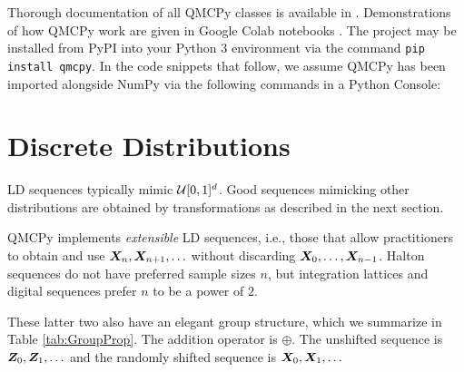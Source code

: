 \documentclass[graybox,footinfo]{svmult}
\begin{document}
Thorough documentation of all QMCPy classes is available in \cite{QMCPyDocs}. Demonstrations of how QMCPy work are given in Google Colab notebooks \cite{QMCPyTutColab2020,QMCPyTutColab2020_paper}. The project may be installed from PyPI into your Python 3 environment via the command \texttt{pip install qmcpy}. In the code snippets that follow, we assume QMCPy has been imported alongside NumPy \cite{numpy} via the following commands in a Python Console:


\section{Discrete Distributions}

LD sequences typically mimic ${\mathcal{U}}[0,1]^d$.  Good sequences mimicking other distributions are obtained by transformations as described in the next section.  

QMCPy implements \emph{extensible} LD sequences, i.e., those that allow practitioners to obtain and use ${\boldsymbol{X}}_n, {\boldsymbol{X}}_{n+1}, \ldots $ without discarding ${\boldsymbol{X}}_0, \ldots, {\boldsymbol{X}}_{n-1}$.  Halton sequences do not have preferred sample sizes $n$, but integration lattices and digital sequences prefer $n$ to be a power of $2$.  

These latter two also have an elegant group structure, which we summarize in Table \ref{tab:GroupProp}.  The addition operator  is $\oplus$.  The unshifted sequence is ${\boldsymbol{Z}}_0, {\boldsymbol{Z}}_1, \ldots$ and the randomly shifted sequence is ${\boldsymbol{X}}_0, {\boldsymbol{X}}_1, \ldots$
\end{document}
